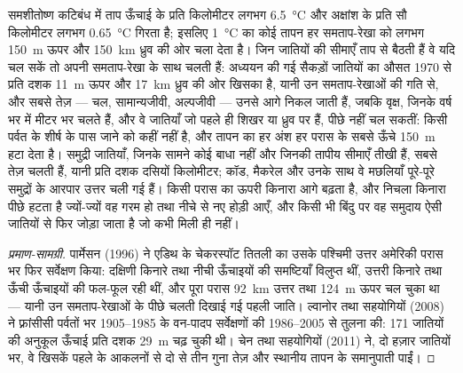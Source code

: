 \begin{proposition}\label{prop:b2:global-change:range}
समशीतोष्ण कटिबंध में ताप ऊँचाई के प्रति किलोमीटर लगभग
\qty{6.5}{\celsius} और अक्षांश के प्रति सौ किलोमीटर लगभग
\qty{0.65}{\celsius} गिरता है; इसलिए \qty{1}{\celsius} का कोई तापन
हर समताप-रेखा को लगभग \qty{150}{m} ऊपर और
\qty{150}{km} ध्रुव की ओर चला देता है। जिन जातियों की सीमाएँ ताप से बैठती हैं वे
यदि चल सकें तो अपनी समताप-रेखा के साथ चलती हैं: अध्ययन की गई सैकड़ों जातियों का
औसत 1970 से प्रति दशक \qty{11}{m} ऊपर और \qty{17}{km}
ध्रुव की ओर खिसका है, यानी उन समताप-रेखाओं की गति से, और
सबसे तेज़ --- चल, सामान्यजीवी, अल्पजीवी --- उनसे आगे निकल जाती हैं,
जबकि वृक्ष, जिनके  वर्ष भर में मीटर भर चलते हैं, और वे जातियाँ जो पहले ही
शिखर या ध्रुव पर हैं, पीछे नहीं चल सकतीं: किसी पर्वत के शीर्ष के पास
जाने को कहीं नहीं है, और तापन का हर अंश हर परास के सबसे ऊँचे
\qty{150}{m} हटा देता है। समुद्री जातियाँ, जिनके सामने कोई बाधा नहीं और जिनकी
तापीय सीमाएँ तीखी हैं, सबसे तेज़ चलती हैं, यानी प्रति दशक दसियों किलोमीटर;
कॉड, मैकरेल और उनके साथ वे मछलियाँ पूरे-पूरे समुद्रों के आरपार उत्तर
चली गई हैं। किसी परास का ऊपरी किनारा आगे बढ़ता है, और निचला
किनारा पीछे हटता है ज्यों-ज्यों वह गरम हो तथा नीचे से नए होड़ी आएँ,
और किसी भी बिंदु पर वह समुदाय ऐसी जातियों से फिर जोड़ा जाता है
जो कभी मिली ही नहीं।
\end{proposition}
\begin{proof}[प्रमाण-सामग्री]
पार्मेसन (1996) ने एडिथ के चेकरस्पॉट तितली का उसके पश्चिमी उत्तर
अमेरिकी परास भर फिर सर्वेक्षण किया: दक्षिणी किनारे तथा नीची ऊँचाइयों की
समष्टियाँ विलुप्त थीं, उत्तरी किनारे तथा ऊँची ऊँचाइयों की फल-फूल रही थीं,
और पूरा परास \qty{92}{km} उत्तर तथा \qty{124}{m} ऊपर चल चुका था ---
यानी उन समताप-रेखाओं के पीछे चलती दिखाई गई पहली जाति। ल्वानोर तथा सहयोगियों (2008) ने
फ़्रांसीसी पर्वतों भर 1905--1985 के वन-पादप सर्वेक्षणों की
1986--2005 से तुलना की: 171 जातियों की अनुकूल ऊँचाई
प्रति दशक \qty{29}{m} चढ़ चुकी थी। चेन तथा सहयोगियों (2011) ने,
दो हज़ार जातियों भर, वे खिसकें पहले के आकलनों से दो से तीन गुना तेज़
और स्थानीय तापन के समानुपाती पाईं।
\end{proof}

